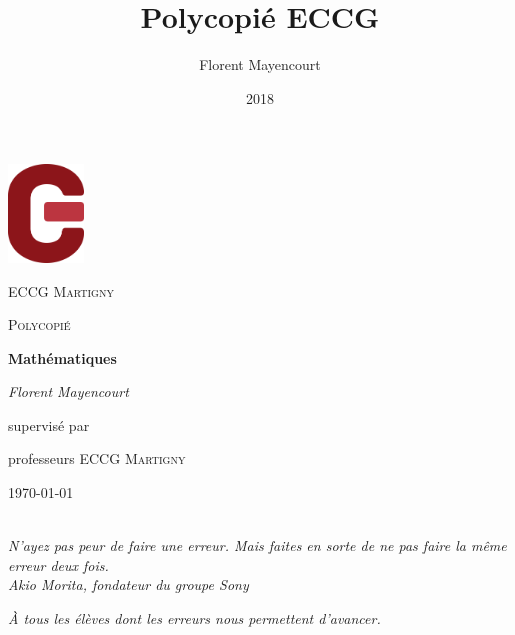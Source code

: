 \documentclass[twoside, a4paper, 12pt, openright, fullpage]{book}
\title{Polycopié ECCG}
\author{Florent Mayencourt}
\date{2018}
\begin{document}
\begin{titlepage}
	\centering
	\includegraphics[width=0.15\textwidth]{logo.png}\par\vspace{1cm}
	{\scshape\LARGE ECCG Martigny \par}
	\vspace{1cm}
	{\scshape\Large Polycopié \par}
	\vspace{1.5cm}
	{\huge\bfseries Mathématiques \par}
	\vspace{2cm}
	{\Large\itshape Florent Mayencourt \par}
	\vfill
	supervisé par \par
	professeurs ECCG \textsc{Martigny}

	\vfill

	{\large \today\par}
\end{titlepage}

\newpage

\thispagestyle{empty}
\begin{flushright}
\textit{
~\\ \hspace{5cm}
N'ayez pas peur de faire une erreur. Mais faites en sorte de ne pas faire la même erreur deux fois.
\\
\textit{Akio Morita, fondateur du groupe Sony}
}
\end{flushright}

\vspace{17cm}

\textit{À tous les élèves dont les erreurs nous permettent d'avancer.}

\thispagestyle{empty}
~\\
\newpage

\tableofcontents




\end{document}
